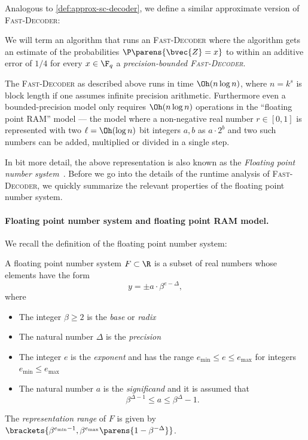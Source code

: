 \documentclass[11pt]{article}
\begin{document}
Analogous to \cref{def:approx-sc-decoder}, we define a similar approximate version of \textsc{Fast-Decoder}:
	\begin{definition}
	\label{def:approx-fast-decoder}
	We will term an algorithm that runs an \textsc{Fast-Decoder} where the algorithm gets an estimate of the probabilities $\P\parens{\bvec{Z} = x}$ to within an additive error of $1/4$ for every $x \in \F_q$  a {\em precision-bounded \textsc{Fast-Decoder}}.
	\end{definition}


The \textsc{Fast-Decoder} as described above runs in time $\Oh(n \log n)$, where $n = k^s$ is block length if one assumes infinite precision arithmetic. Furthermore even a bounded-precision model only requires $\Oh(n \log n)$ operations in the ``floating point RAM'' model --- the model where a non-negative real number $r \in [0,1]$ is represented with two $\ell = \Oh(\log n)$ bit integers $a, b$ as $a\cdot 2^b$ and two such numbers can be added, multiplied or divided in a single step. 

In bit more detail, the above representation is also known as the {\em Floating point number system}~\cite[Chapter 2]{higham-book}. Before we go into the details of the runtime analysis of \textsc{Fast-Decoder}, we quickly summarize the relevant properties of the floating point number system.

\paragraph{Floating point number system and floating point RAM model.}

We recall the definition of the floating point number system:
\begin{definition}
    \label{def:fl}
    A floating point number system $F\subset \R$ is a subset of real numbers whose elements have the form
    \[ y = \pm a\cdot \beta^{e-\Delta},\]
    where
    \begin{itemize}
        \item The integer $\beta\ge 2$ is the {\em base} or {\em radix}
        \item The natural number $\Delta$ is the {\em precision}
        \item The integer $e$ is the {\em exponent} and has the range $e_{\min}\le e\le e_{\max}$ for integers $e_{\min}\le e_{\max}$
        \item The natural number $a$ is the {\em significand} and it is assumed that
        \[\beta^{\Delta-1}\le a \le \beta^{\Delta}-1.\]
    \end{itemize}
    
    The {\em representation range} of $F$ is given by $\brackets{\beta^{e_{\min}-1},\beta^{e_{\max}}\parens{1-\beta^{-\Delta}} }$.
\end{definition}
\end{document}
